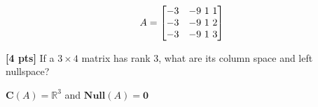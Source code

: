 \documentclass[11pt,addpoints,answers]{exam}
\numberwithin{equation}{section} %
\numberwithin{figure}{section} %
\numberwithin{table}{section} %
\newcommand{\colsp}[1]{\textbf{C$(#1)$}}
\begin{document}
\begin{questions}
    \begin{tcolorbox}[fit,height=3cm, width=\textwidth, blank, borderline={0.5pt}{-2pt}, valign=center, nobeforeafter]
        \begin{align*}
            A = \begin{bmatrix}
                -3 & -9 $ 1 $ 1 \\
                -3 & -9 $ 1 $ 2 \\
                -3 & -9 $ 1 $ 3
            \end{bmatrix}
        \end{align*}
    \end{tcolorbox}

\question \textbf{[4 pts]} If a $3{\times}4$ matrix has rank $3$, what are its column space and left nullspace?

    \begin{tcolorbox}[fit,height=3cm, width=\textwidth, blank, borderline={0.5pt}{-2pt}, valign=center, nobeforeafter]
        $\colsp{A} = \mathbb{R}^3$ and $\textbf{Null}(A) = \mathbf{0}$
    \end{tcolorbox}


\end{questions}
\clearpage

\end{document}
